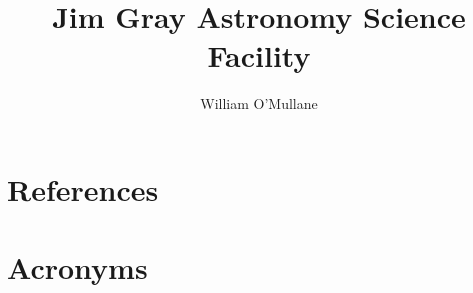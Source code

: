 \documentclass[DM,lsstdraft,authoryear,toc]{lsstdoc}
\title{Jim Gray Astronomy Science Facility}
\author{%
William O'Mullane
}
\date{\vcsDate}
\begin{document}
\mkshorttitle



\appendix

\section{References} \label{sec:bib}
\renewcommand{\refname}{} %


\section{Acronyms} \label{sec:acronyms}

\end{document}
